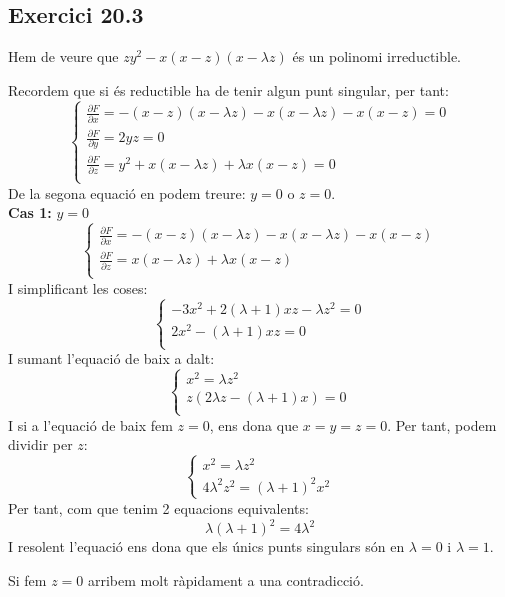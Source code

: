\documentclass[11pt, a4paper]{article}
\begin{document}
\subsection{Exercici 20.3}
Hem de veure que $zy^2 - x(x - z)(x - \lambda z)$ és un polinomi irreductible.\par
Recordem que si és reductible ha de tenir algun punt singular, per tant:
\[
    \begin{cases*}
        \frac{\partial F}{\partial x}=-(x-z)(x-\lambda z)-x(x-\lambda z)-x(x-z)=0\\
        \frac{\partial F}{\partial y}=2yz=0\\
        \frac{\partial F}{\partial z}=y^2+x(x-\lambda z)+\lambda x(x-z)=0\\
    \end{cases*}
\]
De la segona equació en podem treure: $y=0$ o $z=0$.\\
\textbf{Cas 1:} $y=0$\\
\[
    \begin{cases*}
        \frac{\partial F}{\partial x}=-(x-z)(x-\lambda z)-x(x-\lambda z)-x(x-z)\\
        \frac{\partial F}{\partial z}=x(x-\lambda z)+\lambda x(x-z)\\
    \end{cases*}
\]
I simplificant les coses:
\[
    \begin{cases*}
        -3x^2+2(\lambda+1)xz-\lambda z^2=0\\
        2x^2-(\lambda+1)xz=0\\
    \end{cases*}
\]
I sumant l'equació de baix a dalt:
\[
    \begin{cases*}
        x^2=\lambda z^2\\
        z(2\lambda z-(\lambda+1)x)=0\\
    \end{cases*}
\]
I si a l'equació de baix fem $z=0$, ens dona que $x=y=z=0$. Per tant, podem dividir per $z$:
\[
    \begin{cases*}
        x^2=\lambda z^2\\
        4\lambda^2 z^2=(\lambda+1)^2x^2
    \end{cases*}
\]
Per tant, com que tenim 2 equacions equivalents:
\[
    \lambda(\lambda+1)^2=4\lambda^2
\]
I resolent l'equació ens dona que els únics punts singulars són en $\lambda = 0$ i $\lambda=1$.\par
Si fem $z=0$ arribem molt ràpidament a una contradicció.\par
\end{document}
